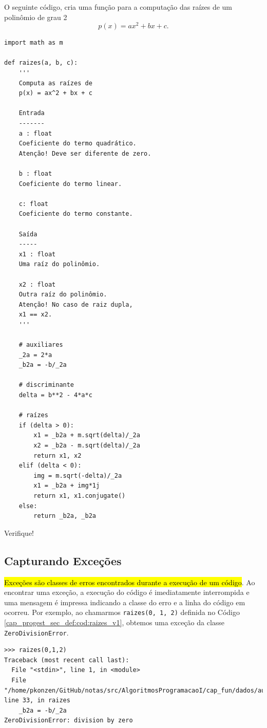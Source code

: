 \begin{ex}
  O seguinte código, cria uma função para a computação das raízes de um polinômio de grau 2
  \begin{equation}
    p(x) = ax^2 + bx + c.
  \end{equation}

\begin{lstlisting}[caption=raizes\_v1.py, label=cap_progest_sec_def:cod:raizes_v1]
import math as m

def raizes(a, b, c):
    '''
    Computa as raízes de
    p(x) = ax^2 + bx + c

    Entrada
    -------
    a : float
    Coeficiente do termo quadrático.
    Atenção! Deve ser diferente de zero.

    b : float 
    Coeficiente do termo linear.

    c: float
    Coeficiente do termo constante.

    Saída
    -----
    x1 : float
    Uma raíz do polinômio.

    x2 : float
    Outra raíz do polinômio.
    Atenção! No caso de raiz dupla,
    x1 == x2.
    '''

    # auxiliares
    _2a = 2*a
    _b2a = -b/_2a

    # discriminante
    delta = b**2 - 4*a*c

    # raízes
    if (delta > 0):
        x1 = _b2a + m.sqrt(delta)/_2a
        x2 = _b2a - m.sqrt(delta)/_2a
        return x1, x2
    elif (delta < 0):
        img = m.sqrt(-delta)/_2a
        x1 = _b2a + img*1j
        return x1, x1.conjugate()
    else:
        return _b2a, _b2a
\end{lstlisting}
  
Verifique!
\end{ex}

\subsection{Capturando Exceções}

\hl{Exceções são classes de erros encontrados durante a execução de um código}. Ao encontrar uma exceção, a execução do código {\python} é imediatamente interrompida e uma mensagem é impressa indicando a classe do erro e a linha do código em ocorreu. Por exemplo, ao chamarmos \lstinline+raizes(0, 1, 2)+ definida no Código \ref{cap_progest_sec_def:cod:raizes_v1}, obtemos uma exceção da classe \lstinline+ZeroDivisionError+.

\begin{lstlisting}
>>> raizes(0,1,2)
Traceback (most recent call last):
  File "<stdin>", line 1, in <module>
  File "/home/pkonzen/GitHub/notas/src/AlgoritmosProgramacaoI/cap_fun/dados/aux.py", line 33, in raizes
    _b2a = -b/_2a
ZeroDivisionError: division by zero
\end{lstlisting}

